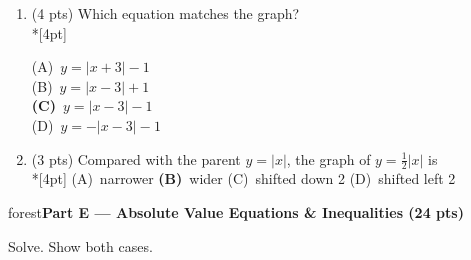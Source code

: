 \documentclass[12pt]{article}
\newcommand{\lgrid}[4]{%
  \draw[step=1, linegray!40, very thin] (#1,#3) grid (#2,#4);
  \draw[->, semithick, charcoal] (#1,0)--(#2,0) node[below right, font=\scriptsize]{$x$};
  \draw[->, semithick, charcoal] (0,#3)--(0,#4) node[left, font=\scriptsize]{$y$};}
\newcommand{\parthead}[1]{%
  \boxguard[10]\vspace{6pt}\noindent
  \begin{headlinebox}{forest}\color{white}\bfseries #1\end{headlinebox}%
  \vspace{4pt}}
\newcommand{\opt}[2]{(#1)~#2}
\newcommand{\optok}[2]{\mbox{\llap{\textcolor{keyred}{$\boldsymbol{\rightarrow}$}\,}\textcolor{keyred}{\textbf{(#1)}~#2}}}
\begin{document}
\begin{enumerate}[leftmargin=1.9em, itemsep=10pt, label=\arabic*., start=15]
  \item {}(4 pts) Which equation matches the graph?
    \\*[4pt]
    \begin{minipage}[c]{0.36\linewidth}\centering
    \end{minipage}%
    \begin{minipage}[c]{0.6\linewidth}
    \opt{A}{$y=|x+3|-1$} \\[6pt]
    \opt{B}{$y=|x-3|+1$} \\[6pt]
    \optok{C}{$y=|x-3|-1$} \\[6pt]
    \opt{D}{$y=-|x-3|-1$}
    \end{minipage}

  \item {}(3 pts) Compared with the parent $y=|x|$, the graph of $y=\tfrac{1}{2}|x|$ is
    \\*[4pt]
    \opt{A}{narrower} \hfill \optok{B}{wider} \hfill \opt{C}{shifted down 2} \hfill
    \opt{D}{shifted left 2}
\end{enumerate}

\parthead{Part E --- Absolute Value Equations \& Inequalities (24 pts)}
Solve. Show both cases.
\end{document}
